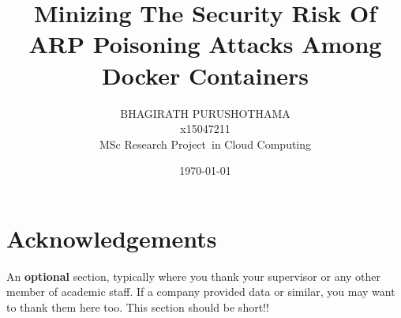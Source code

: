 \documentclass[12pt,a4paper]{article}
\newcommand{\mytype}{MSc Research Project}
\newcommand{\mystream}{Cloud Computing}
\newcommand{\myname}{BHAGIRATH PURUSHOTHAMA}
\newcommand{\SID}{x15047211}
\newcommand{\mytitle}{Minizing The Security Risk Of ARP Poisoning Attacks Among Docker Containers}
\begin{document}




\title{\mytitle}%
\author{\myname \\ \SID \\ \mytype\ in \mystream}%
\date{\today}
\maketitle









\section*{Acknowledgements}
An {\bf optional} section, typically where you thank your supervisor or any other member of academic staff. If a company provided data or similar, you may want to thank them here too. This section should be short!!




												  







\end{document}
